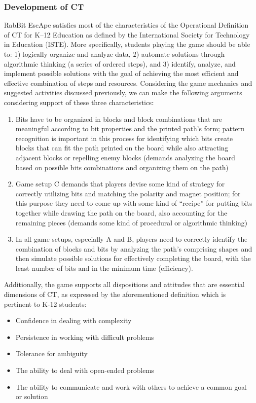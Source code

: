 \documentclass{acm_proc_article-sp}
\begin{document}
\subsubsection{Development of CT}
RabBit EscApe satisfies most of the characteristics of the Operational Definition of CT for K–12 Education as defined by the International Society for Technology in Education (ISTE)\cite{operationalct}. More specifically, students playing the game should be able to: 1) logically organize and analyze data, 2) automate solutions through algorithmic thinking (a series of ordered steps), and 3) identify, analyze, and implement possible solutions with the goal of achieving the most efficient and effective combination of steps and resources. Considering the game mechanics and suggested activities discussed previously, we can make the following arguments considering support of these three characteristics:

\begin{enumerate}
\item{Bits have to be organized in blocks and block combinations that are meaningful according to bit properties and the printed path’s form; pattern recognition is important in this process for identifying which bits create blocks that can fit the path printed on the board while also attracting adjacent blocks or repelling enemy blocks (demands analyzing the board based on possible bits combinations and organizing them on the path)}
\item{Game setup C demands that players devise some kind of strategy for correctly utilizing bits and matching the polarity and magnet position; for this purpose they need to come up with some kind of ``recipe'' for putting bits together while drawing the path on the board, also accounting for the remaining pieces (demands some kind of procedural or algorithmic thinking)}
\item{In all game setups, especially A and B, players need to correctly identify the combination of blocks and bits by analyzing the path’s comprising shapes and then simulate possible solutions for effectively completing the board, with the least number of bits and in the minimum time (efficiency).}
\end{enumerate}

Additionally, the game supports all dispositions and attitudes that are essential dimensions of CT, as expressed by the aforementioned definition which is pertinent to K-12 students:
\begin{itemize}
       \item Confidence in dealing with complexity
       \item Persistence in working with difficult problems
       \item Tolerance for ambiguity
       \item The ability to deal with open-ended problems
       \item The ability to communicate and work with others to achieve a common goal or solution
\end{itemize}
\end{document}
